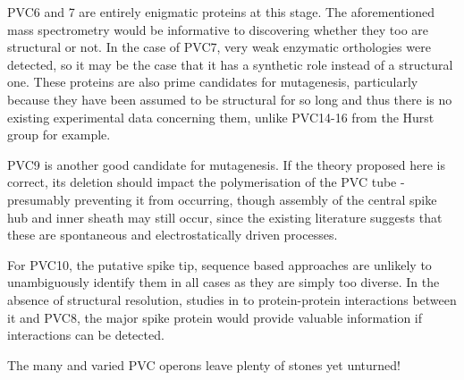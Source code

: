 PVC6 and 7 are entirely enigmatic proteins at this stage. The aforementioned mass spectrometry would be informative to discovering whether they too are structural or not. In the case of PVC7, very weak enzymatic orthologies were detected, so it may be the case that it has a synthetic role instead of a structural one. These proteins are also prime candidates for mutagenesis, particularly because they have been assumed to be structural for so long and thus there is no existing experimental data concerning them, unlike PVC14-16 from the Hurst group for example.

PVC9 is another good candidate for mutagenesis. If the theory proposed here is correct, its deletion should impact the polymerisation of the PVC tube - presumably preventing it from occurring, though assembly of the central spike hub and inner sheath may still occur, since the existing literature suggests that these are spontaneous and electrostatically driven processes.

For PVC10, the putative spike tip, sequence based approaches are unlikely to unambiguously identify them in all cases as they are simply too diverse. In the absence of structural resolution, studies in to protein-protein interactions between it and PVC8, the major spike protein would provide valuable information if interactions can be detected.

The many and varied PVC operons leave plenty of stones yet unturned!


